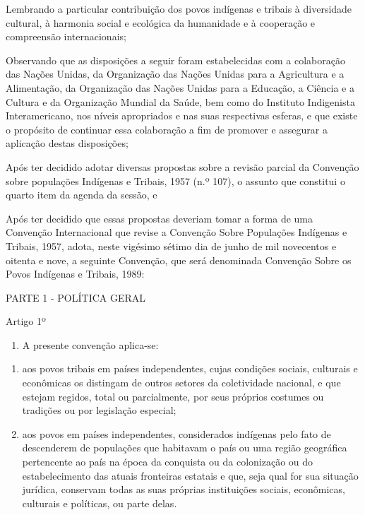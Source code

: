 \documentclass[
]{book}
\providecommand{\tightlist}{%
  \setlength{\itemsep}{0pt}\setlength{\parskip}{0pt}}
\begin{document}
Lembrando a particular contribuição dos povos indígenas e tribais à diversidade cultural, à harmonia social e ecológica da humanidade e à cooperação e compreensão internacionais;

Observando que as disposições a seguir foram estabelecidas com a colaboração das Nações Unidas, da Organização das Nações Unidas para a Agricultura e a Alimentação, da Organização das Nações Unidas para a Educação, a Ciência e a Cultura e da Organização Mundial da Saúde, bem como do Instituto Indigenista Interamericano, nos níveis apropriados e nas suas respectivas esferas, e que existe o propósito de continuar essa colaboração a fim de promover e assegurar a aplicação destas disposições;

Após ter decidido adotar diversas propostas sobre a revisão parcial da Convenção sobre populações Indígenas e Tribais, 1957 (n.º 107), o assunto que constitui o quarto item da agenda da sessão, e

Após ter decidido que essas propostas deveriam tomar a forma de uma Convenção Internacional que revise a Convenção Sobre Populações Indígenas e Tribais, 1957, adota, neste vigésimo sétimo dia de junho de mil novecentos e oitenta e nove, a seguinte Convenção, que será denominada Convenção Sobre os Povos Indígenas e Tribais, 1989:

PARTE 1 - POLÍTICA GERAL

Artigo 1º

\begin{enumerate}
\def\labelenumi{\arabic{enumi}.}
\tightlist
\item
  A presente convenção aplica-se:
\end{enumerate}

\begin{enumerate}
\def\labelenumi{\alph{enumi})}
\item
  aos povos tribais em países independentes, cujas condições sociais, culturais e econômicas os distingam de outros setores da coletividade nacional, e que estejam regidos, total ou parcialmente, por seus próprios costumes ou tradições ou por legislação especial;
\item
  aos povos em países independentes, considerados indígenas pelo fato de descenderem de populações que habitavam o país ou uma região geográfica pertencente ao país na época da conquista ou da colonização ou do estabelecimento das atuais fronteiras estatais e que, seja qual for sua situação jurídica, conservam todas as suas próprias instituições sociais, econômicas, culturais e políticas, ou parte delas.
\end{enumerate}
\end{document}
